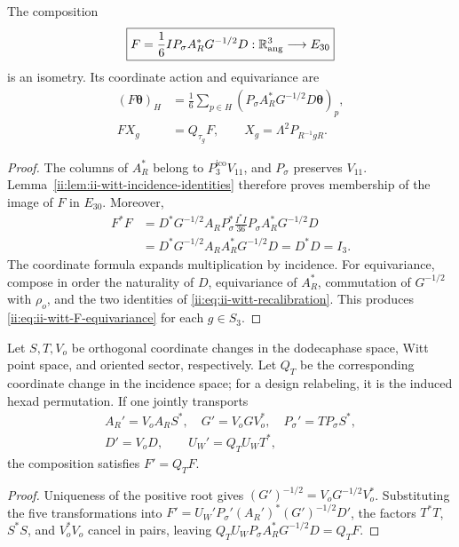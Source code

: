 \begin{theorem}
\label{ii:thm:ii-witt-angular-transport}
The composition
\begin{equation}
 \boxed{F=\frac16 I P_\sigma A_R^*G^{-1/2}D:
        \mathbb R^3_{\rm ang}\longrightarrow E_{30}}
 \label{ii:eq:ii-witt-F}
\end{equation}
is an isometry. Its coordinate action and equivariance are
\begin{align}
 (F\boldsymbol\theta)_H
 &=\frac16\sum_{p\in H}
       (P_\sigma A_R^*G^{-1/2}D\boldsymbol\theta)_p,
       \label{ii:eq:ii-witt-F-coordinates}\\
 F X_g&=Q_{\tau_g}F,
 \qquad X_g=\Lambda^2P_{R^{-1}gR}.
       \label{ii:eq:ii-witt-F-equivariance}
\end{align}
\end{theorem}
\begin{proof}
The columns of \(A_R^*\) belong to \(P_3^{\mathrm{ico}}V_{11}\), and
\(P_\sigma\) preserves \(V_{11}\).
Lemma~\ref{ii:lem:ii-witt-incidence-identities} therefore proves
membership of the image of \(F\) in \(E_{30}\). Moreover,
\begin{align*}
 F^*F
 &=D^*G^{-1/2}A_RP_\sigma^*
       \frac{I^*I}{36}P_\sigma A_R^*G^{-1/2}D\\
 &=D^*G^{-1/2}A_RA_R^*G^{-1/2}D
  =D^*D=I_3.
\end{align*}
The coordinate formula expands multiplication by incidence.
For equivariance, compose in order the naturality of \(D\),
equivariance of \(A_R^*\), commutation of \(G^{-1/2}\) with
\(\rho_o\), and the two identities of
\eqref{ii:eq:ii-witt-recalibration}. This produces
\eqref{ii:eq:ii-witt-F-equivariance} for each \(g\in S_3\).
\end{proof}

\begin{proposition}
\label{ii:prop:ii-witt-gauge-covariance}
Let \(S,T,V_o\) be orthogonal coordinate changes in the dodecaphase
space, Witt point space, and oriented sector,
respectively. Let \(Q_T\) be the corresponding coordinate change
in the incidence space; for a design relabeling, it is the
induced hexad permutation. If one jointly transports
\[
\begin{gathered}
 A_R'=V_oA_RS^*,\quad G'=V_oGV_o^*,\quad
 P_\sigma'=TP_\sigma S^*,\\
 D'=V_oD,\qquad U_W'=Q_TU_WT^*,
\end{gathered}
\]
the composition satisfies \(F'=Q_TF\).
\end{proposition}
\begin{proof}
Uniqueness of the positive root gives
\((G')^{-1/2}=V_oG^{-1/2}V_o^*\). Substituting the five
transformations into
\(F'=U_W'P_\sigma'(A_R')^*(G')^{-1/2}D'\), the factors
\(T^*T\), \(S^*S\), and \(V_o^*V_o\) cancel in pairs, leaving
\(Q_TU_WP_\sigma A_R^*G^{-1/2}D=Q_TF\).
\end{proof}

